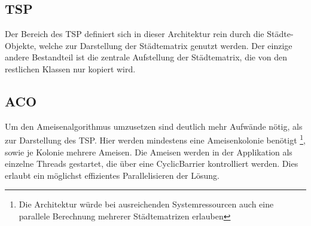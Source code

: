 {	\subsection{TSP}
	Der Bereich des TSP definiert sich in dieser Architektur rein durch die Städte-Objekte, welche zur Darstellung der Städtematrix genutzt werden. Der einzige andere Bestandteil ist die zentrale Aufstellung der Städtematrix, die von den restlichen Klassen nur kopiert wird.
	
	\subsection{ACO}
	Um den Ameisenalgorithmus umzusetzen sind deutlich mehr Aufwände nötig, als zur Darstellung des TSP. Hier werden mindestens eine Ameisenkolonie benötigt \footnote{Die Architektur würde bei ausreichenden Systemressourcen auch eine parallele Berechnung mehrerer Städtematrizen erlauben},
	sowie je Kolonie mehrere Ameisen.
	\newline
	Die Ameisen werden in der Applikation als einzelne Threads gestartet, die über eine CyclicBarrier kontrolliert werden. Dies erlaubt ein möglichst effizientes Parallelisieren der Lösung.
}